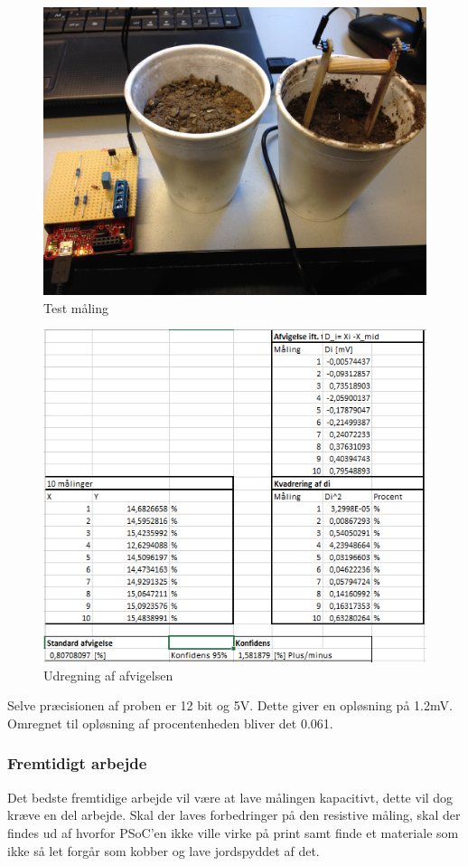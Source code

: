 \begin{figure}[H]
	\centering 
\includegraphics[scale=0.08]{HardwareArkitektur/Sensore/Jordfugt_billeder/test_maling.JPG}
	\caption{Test måling}
	\label{photo:shield}
\end{figure} 

\begin{figure}[H]
	\centering 
\includegraphics[scale=1]{HardwareArkitektur/Sensore/Jordfugt_billeder/afvigelse.PNG}
	\caption{Udregning af afvigelsen}
	\label{photo:shield}
\end{figure} 

Selve præcisionen af proben er 12 bit og 5V. Dette giver en opløsning på 1.2mV. Omregnet til opløsning af procentenheden bliver det 0.061. 

\subsubsection{Fremtidigt arbejde}
Det bedste fremtidige arbejde vil være at lave målingen kapacitivt, dette vil dog kræve en del arbejde. Skal der laves forbedringer på den resistive måling, skal der findes ud af hvorfor PSoC'en ikke ville virke på print samt finde et materiale som ikke så let forgår som kobber og lave jordspyddet af det. 

   
